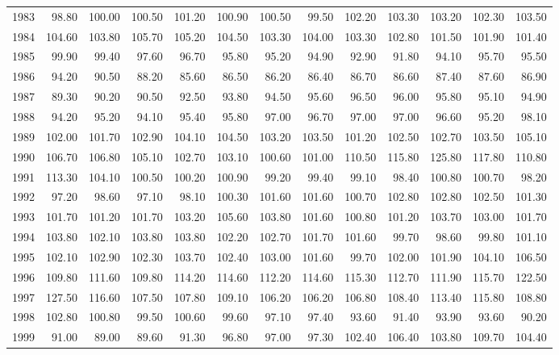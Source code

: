 \begin{longtable}{rrrrrrrrrrrrr}
  1983 & 98.80 & 100.00 & 100.50 & 101.20 & 100.90 & 100.50 & 99.50 & 102.20 & 103.30 & 103.20 & 102.30 & 103.50 \\ 
  1984 & 104.60 & 103.80 & 105.70 & 105.20 & 104.50 & 103.30 & 104.00 & 103.30 & 102.80 & 101.50 & 101.90 & 101.40 \\ 
  1985 & 99.90 & 99.40 & 97.60 & 96.70 & 95.80 & 95.20 & 94.90 & 92.90 & 91.80 & 94.10 & 95.70 & 95.50 \\ 
  1986 & 94.20 & 90.50 & 88.20 & 85.60 & 86.50 & 86.20 & 86.40 & 86.70 & 86.60 & 87.40 & 87.60 & 86.90 \\ 
  1987 & 89.30 & 90.20 & 90.50 & 92.50 & 93.80 & 94.50 & 95.60 & 96.50 & 96.00 & 95.80 & 95.10 & 94.90 \\ 
  1988 & 94.20 & 95.20 & 94.10 & 95.40 & 95.80 & 97.00 & 96.70 & 97.00 & 97.00 & 96.60 & 95.20 & 98.10 \\ 
  1989 & 102.00 & 101.70 & 102.90 & 104.10 & 104.50 & 103.20 & 103.50 & 101.20 & 102.50 & 102.70 & 103.50 & 105.10 \\ 
  1990 & 106.70 & 106.80 & 105.10 & 102.70 & 103.10 & 100.60 & 101.00 & 110.50 & 115.80 & 125.80 & 117.80 & 110.80 \\ 
  1991 & 113.30 & 104.10 & 100.50 & 100.20 & 100.90 & 99.20 & 99.40 & 99.10 & 98.40 & 100.80 & 100.70 & 98.20 \\ 
  1992 & 97.20 & 98.60 & 97.10 & 98.10 & 100.30 & 101.60 & 101.60 & 100.70 & 102.80 & 102.80 & 102.50 & 101.30 \\ 
  1993 & 101.70 & 101.20 & 101.70 & 103.20 & 105.60 & 103.80 & 101.60 & 100.80 & 101.20 & 103.70 & 103.00 & 101.70 \\ 
  1994 & 103.80 & 102.10 & 103.80 & 103.80 & 102.20 & 102.70 & 101.70 & 101.60 & 99.70 & 98.60 & 99.80 & 101.10 \\ 
  1995 & 102.10 & 102.90 & 102.30 & 103.70 & 102.40 & 103.00 & 101.60 & 99.70 & 102.00 & 101.90 & 104.10 & 106.50 \\ 
  1996 & 109.80 & 111.60 & 109.80 & 114.20 & 114.60 & 112.20 & 114.60 & 115.30 & 112.70 & 111.90 & 115.70 & 122.50 \\ 
  1997 & 127.50 & 116.60 & 107.50 & 107.80 & 109.10 & 106.20 & 106.20 & 106.80 & 108.40 & 113.40 & 115.80 & 108.80 \\ 
  1998 & 102.80 & 100.80 & 99.50 & 100.60 & 99.60 & 97.10 & 97.40 & 93.60 & 91.40 & 93.90 & 93.60 & 90.20 \\ 
  1999 & 91.00 & 89.00 & 89.60 & 91.30 & 96.80 & 97.00 & 97.30 & 102.40 & 106.40 & 103.80 & 109.70 & 104.40 \\ 

\end{longtable}

